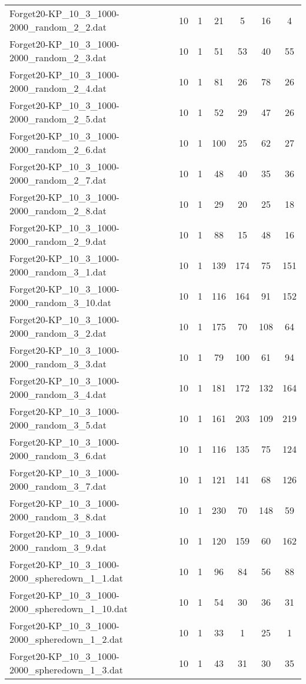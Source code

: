 \begin{table}[!ht]
\begin{tabular}{lcccccc}
Forget20-KP\_10\_3\_1000-2000\_random\_2\_2.dat & 10 & 1 & 21 & 5 & 16 & 4 \\
Forget20-KP\_10\_3\_1000-2000\_random\_2\_3.dat & 10 & 1 & 51 & 53 & 40 & 55 \\
Forget20-KP\_10\_3\_1000-2000\_random\_2\_4.dat & 10 & 1 & 81 & 26 & 78 & 26 \\
Forget20-KP\_10\_3\_1000-2000\_random\_2\_5.dat & 10 & 1 & 52 & 29 & 47 & 26 \\
Forget20-KP\_10\_3\_1000-2000\_random\_2\_6.dat & 10 & 1 & 100 & 25 & 62 & 27 \\
Forget20-KP\_10\_3\_1000-2000\_random\_2\_7.dat & 10 & 1 & 48 & 40 & 35 & 36 \\
Forget20-KP\_10\_3\_1000-2000\_random\_2\_8.dat & 10 & 1 & 29 & 20 & 25 & 18 \\
Forget20-KP\_10\_3\_1000-2000\_random\_2\_9.dat & 10 & 1 & 88 & 15 & 48 & 16 \\
Forget20-KP\_10\_3\_1000-2000\_random\_3\_1.dat & 10 & 1 & 139 & 174 & 75 & 151 \\
Forget20-KP\_10\_3\_1000-2000\_random\_3\_10.dat & 10 & 1 & 116 & 164 & 91 & 152 \\
Forget20-KP\_10\_3\_1000-2000\_random\_3\_2.dat & 10 & 1 & 175 & 70 & 108 & 64 \\
Forget20-KP\_10\_3\_1000-2000\_random\_3\_3.dat & 10 & 1 & 79 & 100 & 61 & 94 \\
Forget20-KP\_10\_3\_1000-2000\_random\_3\_4.dat & 10 & 1 & 181 & 172 & 132 & 164 \\
Forget20-KP\_10\_3\_1000-2000\_random\_3\_5.dat & 10 & 1 & 161 & 203 & 109 & 219 \\
Forget20-KP\_10\_3\_1000-2000\_random\_3\_6.dat & 10 & 1 & 116 & 135 & 75 & 124 \\
Forget20-KP\_10\_3\_1000-2000\_random\_3\_7.dat & 10 & 1 & 121 & 141 & 68 & 126 \\
Forget20-KP\_10\_3\_1000-2000\_random\_3\_8.dat & 10 & 1 & 230 & 70 & 148 & 59 \\
Forget20-KP\_10\_3\_1000-2000\_random\_3\_9.dat & 10 & 1 & 120 & 159 & 60 & 162 \\
Forget20-KP\_10\_3\_1000-2000\_spheredown\_1\_1.dat & 10 & 1 & 96 & 84 & 56 & 88 \\
Forget20-KP\_10\_3\_1000-2000\_spheredown\_1\_10.dat & 10 & 1 & 54 & 30 & 36 & 31 \\
Forget20-KP\_10\_3\_1000-2000\_spheredown\_1\_2.dat & 10 & 1 & 33 & 1 & 25 & 1 \\
Forget20-KP\_10\_3\_1000-2000\_spheredown\_1\_3.dat & 10 & 1 & 43 & 31 & 30 & 35 \\

\end{tabular}
\end{table}
